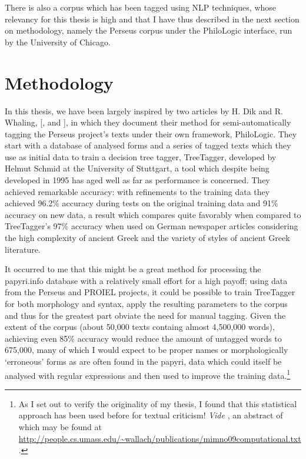 There is also a corpus which has been tagged using NLP techniques, whose
relevancy for this thesis is high and that I have thus described in the next
section on methodology, namely the Perseus corpus under the PhiloLogic
interface, run by the University of Chicago.

\section{Methodology}

In this thesis, we have been largely inspired by two articles by H. Dik and R.
Whaling, [\citeauthor{dik2008}, \citeyear{dik2008} and \citeyear{dik2009}], in
which they document their method for semi-automatically tagging the Perseus
project's texts under their own framework, PhiloLogic. They start with a
database of analysed forms and a series of tagged texts which they use as
initial data to train a decision tree tagger, TreeTagger, developed by Helmut
Schmid at the University of Stuttgart, a tool which despite being developed in
1995 has aged well as far as performance is concerned. They achieved remarkable
accuracy: with refinements to the training data they achieved 96.2\% accuracy
during tests on the original training data and 91\% accuracy on new data, a
result which compares quite favorably when compared to TreeTagger's 97\%
accuracy when used on German newspaper articles considering the high complexity
of ancient Greek and the variety of styles of ancient Greek literature.

It occurred to me that this might be a great method for processing the
papyri.info database with a relatively small effort for a high payoff; using
data from the Perseus and PROIEL projects, it could be possible to train
TreeTagger for both morphology and syntax, apply the resulting parameters to
the corpus and thus for the greatest part obviate the need for manual tagging.
Given the extent of the corpus (about 50,000 texts containg almost 4,500,000
words), achieving even 85\% accuracy would reduce the amount of untagged words
to 675,000, many of which I would expect to be proper names or morphologically
`erroneous' forms as are often found in the papyri, data which could itself be
analysed with regular expressions and then used to improve the training
data.\footnote{As I set out to verify the originality of my thesis, I found
  that this statistical approach has been used before for textual criticism!
  \textit{Vide} \citet{mimno2009}, an abstract of which may be found at
  \url{http://people.cs.umass.edu/~wallach/publications/mimno09computational.txt}.}

